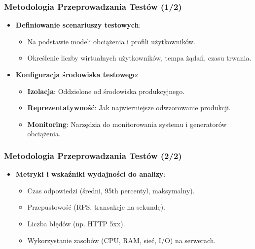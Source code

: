 \documentclass[aspectratio=169,xcolor=table]{beamer}
\begin{document}
\begin{frame}
  \frametitle{Metodologia Przeprowadzania Testów (1/2)}
  \begin{itemize}
    \item \textbf{Definiowanie scenariuszy testowych}:
        \begin{itemize}
            \item Na podstawie modeli obciążenia i profili użytkowników.
            \item Określenie liczby wirtualnych użytkowników, tempa żądań, czasu trwania.
        \end{itemize}
    \item \textbf{Konfiguracja środowiska testowego}:
        \begin{itemize}
            \item \textbf{Izolacja}: Oddzielone od środowiska produkcyjnego.
            \item \textbf{Reprezentatywność}: Jak najwierniejsze odwzorowanie produkcji.
            \item \textbf{Monitoring}: Narzędzia do monitorowania systemu i generatorów obciążenia.
        \end{itemize}
  \end{itemize}
\end{frame}
\begin{frame}
  \frametitle{Metodologia Przeprowadzania Testów (2/2)}
  \begin{itemize}
    \item \textbf{Metryki i wskaźniki wydajności do analizy}:
        \begin{itemize}
            \item Czas odpowiedzi (średni, 95th percentyl, maksymalny).
            \item Przepustowość (RPS, transakcje na sekundę).
            \item Liczba błędów (np. HTTP 5xx).
            \item Wykorzystanie zasobów (CPU, RAM, sieć, I/O) na serwerach.
        \end{itemize}
  \end{itemize}
\end{frame}
\end{document}
